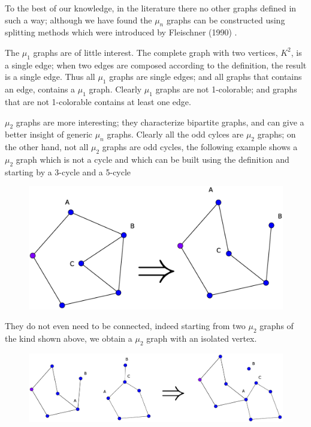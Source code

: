\documentclass[a4paper,12pt,oneside]{book}
\begin{document}
To the best of our knowledge, in the literature there no other graphs defined in such a way; although we have found the $\mu_n$ graphs can be constructed using splitting methods which were introduced by Fleischner (1990) \cite{split}.

The $\mu_1$ graphs are of little interest. The complete graph with two vertices, $K^2$, is a single edge; when two edges are composed according to the definition, the result is a single edge. Thus all $	\mu_1$ graphs are single edges; and all graphs that contains  an edge, contains a $\mu_1$ graph. Clearly $\mu_1$ graphs are not 1-colorable; and graphs that are not 1-colorable contains at least one edge.

$\mu_2$ graphs are more interesting; they characterize bipartite graphs, and can give a better insight of generic $\mu_n$ graphs. Clearly all the odd cylces are $\mu_2$ graphs; on the other hand, not all $\mu_2$ graphs are odd cycles, the following example shows a $\mu_2$ graph which is not a cycle and which can be built using the definition and starting by a 3-cycle and a 5-cycle 
\begin{figure}[h]
\centering\includegraphics[scale=0.25]{mu2.eps}
\end{figure}

\noindent They do not even need to be connected, indeed starting from two $\mu_2$ graphs of the kind shown above, we obtain a $\mu_2$ graph with an isolated vertex.

\begin{figure}[h]
\centering\includegraphics[scale=0.25]{mu2-con1.eps}
\end{figure}
\end{document}

